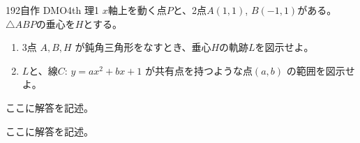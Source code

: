 \begin{thm}{192}{}{自作 DMO4th 理1}
 $x$軸上を動く点$P$と、2点$A(1,1)$, $B(-1,1)$がある。$\triangle{ABP}$の垂心を$H$とする。
 \begin{enumerate}
  \item 3点 $A, B, H$ が鈍角三角形をなすとき、垂心$H$の軌跡$L$を図示せよ。
  \item $L$と、線$C:\, y=ax^2+bx+1$ が共有点を持つような点$(a,b)$ の範囲を図示せよ。
 \end{enumerate}
\end{thm}

ここに解答を記述。

ここに解答を記述。